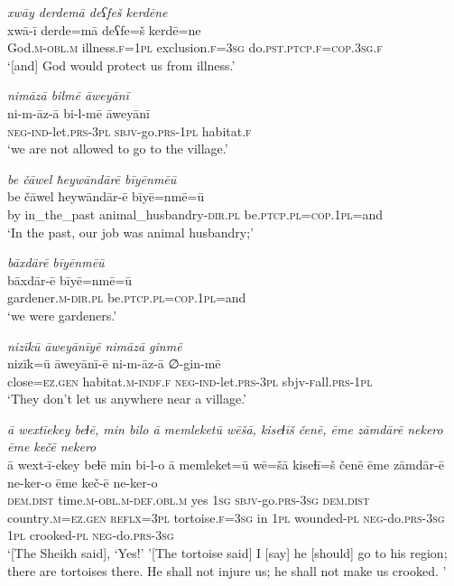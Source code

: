 \ea \label{DG.7}
\textit{xwāy derdemā deʕfeš kerdēne} \\ 
\gll xwā-ī derde=mā deʕfe=š kerdē=ne \\ 
 God\textsc{.m}\textsc{-obl}\textsc{.m} illness\textsc{\textsc{.f}}\textsc{=1pl} exclusion\textsc{\textsc{.f}}\textsc{=3sg} do\textsc{.pst}\textsc{.ptcp}\textsc{\textsc{.f}}\textsc{=cop}\textsc{.3sg}\textsc{\textsc{.f}} \\ 
\glt `[and] God would protect us from illness.'
\z 
 
\ea \label{DG.35}
\textit{nimāzā bilmē āweyānī} \\ 
\gll ni-m-āz-ā bi-l-mē āweyānī \\ 
 \textsc{neg-}\textsc{ind-}let\textsc{.prs}\textsc{-3pl} \textsc{sbjv-}go\textsc{.prs}\textsc{-1pl} habitat\textsc{\textsc{.f}} \\ 
\glt `we are not allowed to go to the village.'
\z 
 
\ea \label{DG.36}
\textit{be čāwel ħeywāndārē bīyēnmēū} \\ 
\gll be čāwel ħeywāndār-ē bīyē=nmē=ū \\ 
 by in\_the\_past animal\_husbandry\textsc{-dir}\textsc{.pl} be\textsc{.ptcp}\textsc{.pl}\textsc{=cop}\textsc{.1pl}=and \\ 
\glt `In the past, our job was animal husbandry;'
\z 
 
\ea \label{DG.37}
\textit{bāxdārē bīyēnmēū} \\ 
\gll bāxdār-ē bīyē=nmē=ū \\ 
 gardener\textsc{.m}\textsc{-dir}\textsc{.pl} be\textsc{.ptcp}\textsc{.pl}\textsc{=cop}\textsc{.1pl}=and \\ 
\glt `we were gardeners.'
\z 
 
\ea \label{DG.42}
\textit{nizīkū āweyānīyē nimāzā ginmē} \\ 
\gll nizīk=ū āweyānī-ē ni-m-āz-ā ∅-gin-mē \\ 
 close\textsc{=ez}\textsc{.gen} habitat\textsc{\textsc{.m}}\textsc{-indf}\textsc{\textsc{.f}} \textsc{neg-}\textsc{ind-}let\textsc{.prs}\textsc{-3pl} sbjv\textsc{-f}all\textsc{.prs}\textsc{-1pl} \\ 
\glt `They don’t let us anywhere near a village.'
\z 
 
\ea \label{DG.64}
\textit{ā wextīekey beɫē, min bilo ā memleketū wēšā, kiseɫīš čenē, ēme zāmdārē nekero ēme kečē nekero} \\ 
\gll ā wext-ī-ekey beɫē min bi-l-o ā memleket=ū wē=šā kiseɫī=š čenē ēme zāmdār-ē ne-ker-o ēme keč-ē ne-ker-o \\ 
 \textsc{dem.dist} time\textsc{.m}\textsc{-obl}\textsc{.m}\textsc{-def}\textsc{.obl}\textsc{.m} yes \textsc{1sg} \textsc{sbjv-}go\textsc{.prs}\textsc{-3sg} \textsc{dem.dist} country\textsc{.m}\textsc{=ez}\textsc{.gen} \textsc{reflx}\textsc{=3pl} tortoise\textsc{\textsc{.f}}\textsc{=3sg} in \textsc{1pl} wounded\textsc{\textsc{-pl}} \textsc{neg-}do\textsc{.prs}\textsc{-3sg} \textsc{1pl} crooked\textsc{\textsc{-pl}} \textsc{neg-}do\textsc{.prs}\textsc{-3sg} \\ 
\glt `[The Sheikh said], ‘Yes!' '[The tortoise said] I [say] he [should] go to his region; there are tortoises there. He shall not injure us; he shall not make us crooked. '
\z 
 
